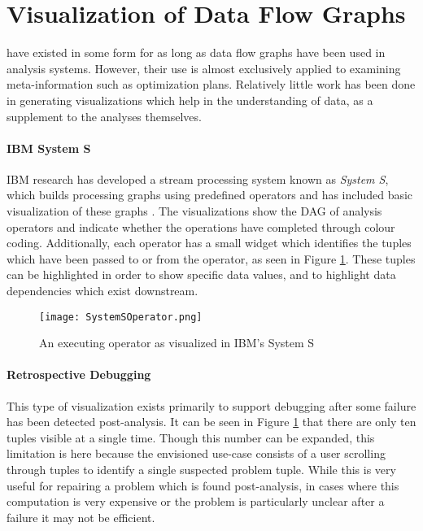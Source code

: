 \section{Visualization of Data Flow Graphs}
\label{sec:dfgviz}

 have existed in some form for as long as data flow graphs have been used in analysis systems. However, their use is almost exclusively applied to examining meta-information such as optimization plans. Relatively little work has been done in generating visualizations which help in the understanding of data, as a supplement to the analyses themselves.

\paragraph{IBM System S}
IBM research has developed a stream processing system known as \emph{System S}, which builds processing graphs using predefined operators \cite{Gedik2008} and has included basic visualization of these graphs \cite{Pauw2010}. The visualizations show the DAG of analysis operators and indicate whether the operations have completed through colour coding. Additionally, each operator has a small widget which identifies the tuples which have been passed to or from the operator, as seen in Figure \ref{fig:systemsop}. These tuples can be highlighted in order to show specific data values, and to highlight data dependencies which exist downstream.

\begin{figure}
	\centering
	\label{fig:systemsop}
	\texttt{[image: SystemSOperator.png]}
	\caption{An executing operator as visualized in IBM's System S \cite{Pauw2010}}
\end{figure}

\paragraph{Retrospective Debugging}
This type of visualization exists primarily to support debugging after some failure has been detected post-analysis. It can be seen in Figure \ref{fig:systemsop} that there are only ten tuples visible at a single time. Though this number can be expanded, this limitation is here because the envisioned use-case consists of a user scrolling through tuples to identify a single suspected problem tuple. While this is very useful for repairing a problem which is found post-analysis, in cases where this computation is very expensive or the problem is particularly unclear after a failure it may not be efficient. 

